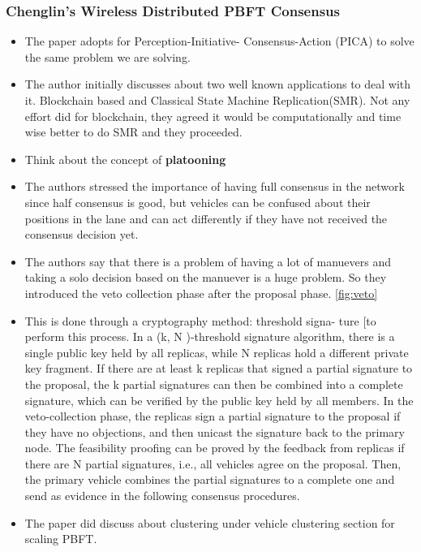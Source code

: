 \documentclass[fleqn,10pt]{olplainarticle}
\begin{document}
\subsubsection{Chenglin's Wireless Distributed PBFT Consensus}
\begin{itemize}
    \item The paper \cite{10041971} adopts for Perception-Initiative-
Consensus-Action (PICA) to solve the same problem we are solving.
    \item The author initially discusses about two well known applications to deal with it. Blockchain based and Classical State Machine Replication(SMR). Not any effort did for blockchain, they agreed it would be computationally and time wise better to do SMR and they proceeded.
    \item Think about the concept of \textbf{platooning}
    \item The authors stressed the importance of having full consensus in the network since half consensus is good, but vehicles can be confused about their positions in the lane and can act differently if they have not received the consensus decision yet.
    \item The authors say that there is a problem of having a lot of manuevers and taking a solo decision based on the manuever is a huge problem. So they introduced the veto collection phase after the proposal phase.  \ref{fig:veto}
    \item This is done through a cryptography method: threshold signa-
    ture [to perform this process. In a (k, N )-threshold signature
    algorithm, there is a single public key held by all replicas, while
    N replicas hold a different private key fragment. If there are at
    least k replicas that signed a partial signature to the proposal,
    the k partial signatures can then be combined into a complete
    signature, which can be verified by the public key held by all
    members. In the veto-collection phase, the replicas sign a partial
    signature to the proposal if they have no objections, and then
    unicast the signature back to the primary node. The feasibility
    proofing can be proved by the feedback from replicas if there
    are N partial signatures, i.e., all vehicles agree on the proposal.
    Then, the primary vehicle combines the partial signatures to a
    complete one and send as evidence in the following consensus
    procedures.
    \item The paper did discuss about clustering under vehicle clustering section for scaling PBFT. 

\end{itemize}
\end{document}
